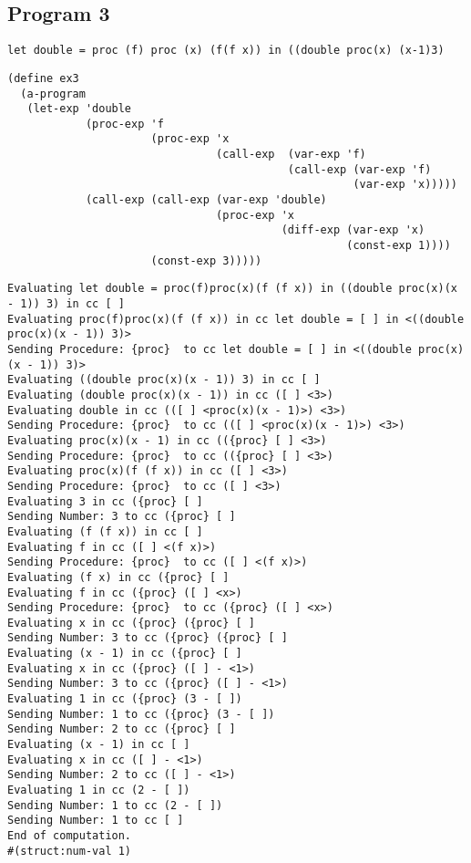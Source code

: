 \documentclass[../main.tex]{subfiles}
\begin{document}
\subsection{Program 3}

\begin{lstlisting}
let double = proc (f) proc (x) (f(f x)) in ((double proc(x) (x-1)3)
\end{lstlisting}

\begin{lstlisting}
(define ex3
  (a-program
   (let-exp 'double
            (proc-exp 'f
                      (proc-exp 'x
                                (call-exp  (var-exp 'f)
                                           (call-exp (var-exp 'f)
                                                     (var-exp 'x)))))
            (call-exp (call-exp (var-exp 'double)
                                (proc-exp 'x
                                          (diff-exp (var-exp 'x)
                                                    (const-exp 1))))
                      (const-exp 3)))))
\end{lstlisting}

\begin{lstlisting}
Evaluating let double = proc(f)proc(x)(f (f x)) in ((double proc(x)(x - 1)) 3) in cc [ ]
Evaluating proc(f)proc(x)(f (f x)) in cc let double = [ ] in <((double proc(x)(x - 1)) 3)>
Sending Procedure: {proc}  to cc let double = [ ] in <((double proc(x)(x - 1)) 3)>
Evaluating ((double proc(x)(x - 1)) 3) in cc [ ]
Evaluating (double proc(x)(x - 1)) in cc ([ ] <3>)
Evaluating double in cc (([ ] <proc(x)(x - 1)>) <3>)
Sending Procedure: {proc}  to cc (([ ] <proc(x)(x - 1)>) <3>)
Evaluating proc(x)(x - 1) in cc (({proc} [ ] <3>)
Sending Procedure: {proc}  to cc (({proc} [ ] <3>)
Evaluating proc(x)(f (f x)) in cc ([ ] <3>)
Sending Procedure: {proc}  to cc ([ ] <3>)
Evaluating 3 in cc ({proc} [ ]
Sending Number: 3 to cc ({proc} [ ]
Evaluating (f (f x)) in cc [ ]
Evaluating f in cc ([ ] <(f x)>)
Sending Procedure: {proc}  to cc ([ ] <(f x)>)
Evaluating (f x) in cc ({proc} [ ]
Evaluating f in cc ({proc} ([ ] <x>)
Sending Procedure: {proc}  to cc ({proc} ([ ] <x>)
Evaluating x in cc ({proc} ({proc} [ ]
Sending Number: 3 to cc ({proc} ({proc} [ ]
Evaluating (x - 1) in cc ({proc} [ ]
Evaluating x in cc ({proc} ([ ] - <1>)
Sending Number: 3 to cc ({proc} ([ ] - <1>)
Evaluating 1 in cc ({proc} (3 - [ ])
Sending Number: 1 to cc ({proc} (3 - [ ])
Sending Number: 2 to cc ({proc} [ ]
Evaluating (x - 1) in cc [ ]
Evaluating x in cc ([ ] - <1>)
Sending Number: 2 to cc ([ ] - <1>)
Evaluating 1 in cc (2 - [ ])
Sending Number: 1 to cc (2 - [ ])
Sending Number: 1 to cc [ ]
End of computation.
#(struct:num-val 1)
\end{lstlisting}
\end{document}

